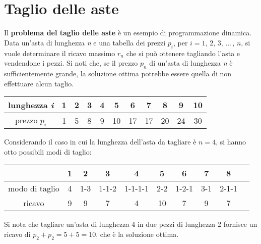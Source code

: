 \documentclass[10pt, a4paper]{report}
\begin{document}
\section{Taglio delle aste}
Il \textbf{problema del taglio delle aste} è un esempio di programmazione dinamica. Data un'asta di lunghezza \textit{n} e una tabella dei prezzi $p_i$, per $i = 1,\,2,\,3,\,...\,,\,n$, si vuole determinare il ricavo massimo $r_n$ che si può ottenere tagliando l'asta e vendendone i pezzi. Si noti che, se il prezzo $p_n$ di un'asta di lunghezza \textit{n} è sufficientemente grande, la soluzione ottima potrebbe essere quella di non effettuare alcun taglio.
\begin{center}
\begin{tabular}{c | cccccccccc}
lunghezza \textit{i} &1 &2 &3 &4 &5 &6 &7 &8 &9 &10\\
\hline
prezzo $p_i$ &1 &5 &8 &9 &10 &17 &17 &20 &24 &30
\end{tabular}
\end{center}
Considerando il caso in cui la lunghezza dell'asta da tagliare è $n = 4$, si hanno otto possibili modi di taglio:
\begin{center}
\begin{tabular}{c | ccccccccc}
 &1 &2 &3 &4 &5 &6 &7 &8\\
\hline
modo di taglio &4 &1-3 &1-1-2 &1-1-1-1 &2-2 &1-2-1 &3-1 &2-1-1\\
ricavo &9 &9 &7 &4 &10 &7 &9 &7
\end{tabular}
\end{center}
Si nota che tagliare un'asta di lunghezza 4 in due pezzi di lunghezza 2 fornisce un ricavo di $p_2 + p_2 = 5 + 5 = 10$, che è la soluzione ottima.
\end{document}
